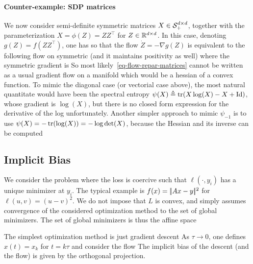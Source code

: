 \paragraph{Counter-example: SDP matrices}

We now consider semi-definite symmetric matrices $X \in \mathcal{S}_+^{d \times d}$, together with the parameterization $X = \phi(Z) = ZZ^\top$ for $Z \in \mathbb{R}^{d \times d}$.
%
In this case, denoting $g(Z)=f(ZZ^\top)$, one has
so that the flow $\dot Z = -\nabla g(Z)$ is equivalent to the following flow on symmetric (and it maintains positivity as well)
where the symmetric gradient is
So most likely~\eqref{eq-flow-repar-matrices} cannot be written as a usual gradient flow on a manifold which would be a hessian of a convex function. To mimic the diagonal case (or vectorial case above), the most natural quantitate would have been the spectral entropy $\psi(X) \triangleq \operatorname{tr}( X \log(X)-X+\mathrm{Id})$,  whose gradient is $\log(X)$, but there is no closed form expression for the derivative of the log unfortunately.
%
Another simpler approach to mimic $\psi_{-1}$ is to use $\psi(X)=-\operatorname{tr}(\log(X))=-\log\det(X)$, because the Hessian and its inverse can be computed




\subsection{Implicit Bias}


We consider the problem
where the loss is coercive such that $\ell(\cdot,y_i)$ has a unique minimizer at $y_i$. The typical example is $f(x)=|\!| Ax-y |\!|^2$ for $\ell(u,v)=(u-v)^2$. 
%
We do not impose that $L$ is convex, and simply assumes convergence of the considered optimization method to the set of global minimizers.
%
The set of global minimizers is thus the affine space

The simplest optimization method is just gradient descent 
As $\tau \rightarrow 0$, one defines $x(t)=x_k$ for $t=k\tau$ and consider the flow
The implicit bias of the descent (and the flow) is given by the orthogonal projection. 

